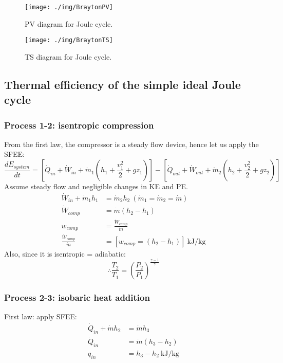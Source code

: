\begin{figure}
  \centering
  \texttt{[image: ./img/BraytonPV]}
  \caption{PV diagram for Joule cycle.}
\end{figure}
\begin{figure}
  \centering
  \texttt{[image: ./img/BraytonTS]}
  \caption{TS diagram for Joule cycle.}
\end{figure}
\subsection{Thermal efficiency of the simple ideal Joule cycle}
\subsubsection{Process 1-2: isentropic compression}
From the first law, the compressor is a steady flow device, hence let us apply the SFEE:
\begin{equation}
  \frac{dE_{system}}{dt} = [\dot{Q}_{in} + \dot{W}_{in} + \dot{m}_1 (h_1 + \frac{v_1^2}{2} + gz_1) ] - [\dot{Q}_{out} + \dot{W}_{out} + \dot{m}_2 (h_2 + \frac{v_2^2}{2} + gz_2) ]
\end{equation}
Assume steady flow and negligible changes in KE and PE.
\begin{align}
  \dot{W}_{in} + \dot{m}_1 h_1   & = \dot{m}_2 h_2 \ (\dot{m}_1 = \dot{m}_2 = \dot{m})   \\
  \dot{W}_{comp}                 & = \dot{m}(h_2 - h_1)                                  \\
  w_{comp}                       & = \frac{\dot{W}_{comp}}{\dot{m}}                      \\
  \frac{\dot{W}_{comp}}{\dot{m}} & = [ w_{comp} = (h_2 - h_1)] \ \si{\kilo\joule\per\kg}
\end{align}
Also, since it is isentropic = adiabatic:
\begin{equation}
  \therefore \frac{T_2}{T_1} = \left( \frac{P_2}{P_1} \right)^{\frac{\gamma - 1}{\gamma}}
\end{equation}
\subsubsection{Process 2-3: isobaric heat addition}
First law: apply SFEE:
\begin{align}
  \dot{Q}_{in} + \dot{m} h_2 & = \dot{m} h_3                         \\
  \dot{Q}_{in}               & = \dot{m} (h_3 - h_2)                 \\
  q_{in}                     & = h_3 - h_2 \ \si{\kilo\joule\per\kg}
\end{align}
